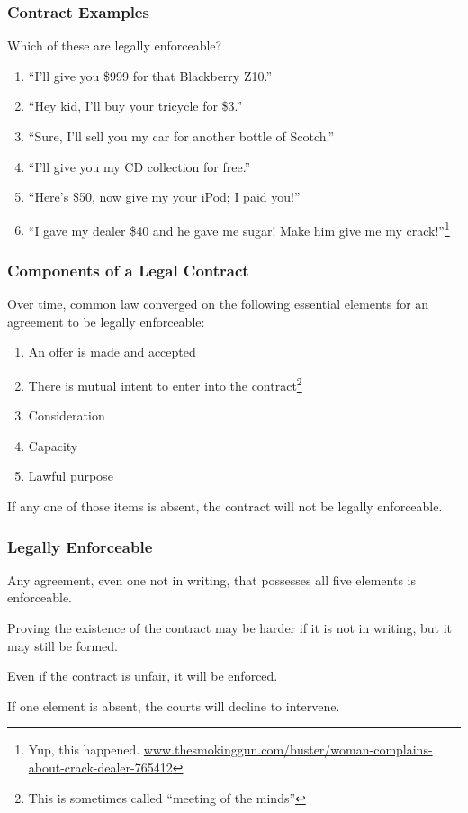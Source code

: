 \begin{frame}
\frametitle{Contract Examples}

Which of these are legally enforceable?

\begin{enumerate}
	\item ``I'll give you \$999 for that Blackberry Z10.''
	\item ``Hey kid, I'll buy your tricycle for \$3.''
	\item ``Sure, I'll sell you my car for another bottle of Scotch.''
	\item ``I'll give you my CD collection for free.''
	\item ``Here's \$50, now give my your iPod; I paid you!''
	\item ``I gave my dealer \$40 and he gave me sugar! Make him give me my crack!''\footnote{Yup, this happened. \url{www.thesmokinggun.com/buster/woman-complains-about-crack-dealer-765412}}
\end{enumerate}

\end{frame}



\begin{frame}
\frametitle{Components of a Legal Contract}

Over time, common law converged on the following essential elements for an agreement to be legally enforceable:

\begin{enumerate}
	\item An offer is made and accepted
	\item There is mutual intent to enter into the contract\footnote{This is sometimes called ``meeting of the minds''}
	\item Consideration
	\item Capacity
	\item Lawful purpose
\end{enumerate}

If any one of those items is absent, the contract will not be legally enforceable.

\end{frame}



\begin{frame}
\frametitle{Legally Enforceable}

Any agreement, even one not in writing, that possesses all five elements is enforceable.

Proving the existence of the contract may be harder if it is not in writing, but it may still be formed.

Even if the contract is unfair, it will be enforced.

If one element is absent, the courts will decline to intervene.

\end{frame}



